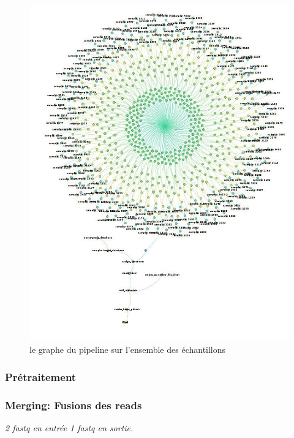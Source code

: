 \documentclass[12pt,a4paper]{article}
\begin{document}
\begin{figure}[ht]
\begin{center}
\includegraphics[scale=0.4]{img/dag.jpg}\hfill
\end{center}
\caption{le graphe du pipeline sur l'ensemble des échantillons}
\label{dag}
\end{figure}

\subsubsection{Prétraitement}
\subsubsection{Merging: Fusions des reads}\begin{center}\emph{ 2 fastq en entrée 1 fastq en sortie. } \end{center}
\end{document}
